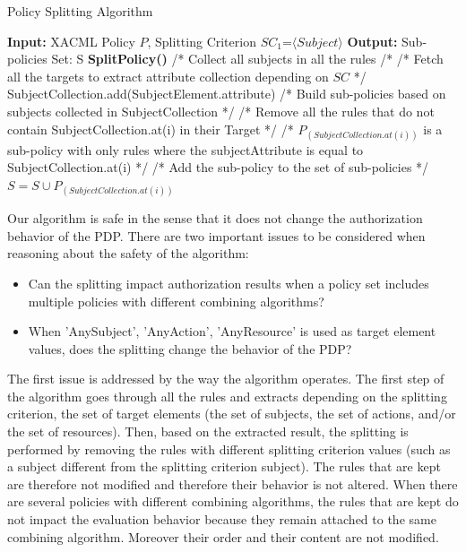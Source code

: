 \begin{algorithmic}
\begin{algorithm}[t]
\caption{Policy Splitting Algorithm}
\STATE \textbf{Input:} XACML Policy $P$, Splitting Criterion $SC_{1}$=$\langle Subject \rangle$
\STATE \textbf{Output:} Sub-policies Set: S
\STATE \textbf{SplitPolicy()}
\STATE /* Collect all subjects in all the rules /*
\STATE /* Fetch all the targets to extract attribute collection depending on $SC$ */
\STATE SubjectCollection.add(SubjectElement.attribute)
\ENDFOR
\ENDFOR
\STATE /* Build sub-policies based on subjects collected in SubjectCollection */
\STATE /* Remove all the rules that do not contain SubjectCollection.at(i) in their Target */
\ENDIF 
\ENDIF
\ENDFOR
\STATE /* $P_{(SubjectCollection.at(i))}$ is a sub-policy with only rules where the subjectAttribute is equal to SubjectCollection.at(i) */
\STATE /* Add the sub-policy to the set of sub-policies */
\STATE $S=S \cup P_{(SubjectCollection.at(i))}$
\ENDFOR
\end{algorithm}
\end{algorithmic}

Our algorithm is safe in the sense that it does not change the authorization behavior of the PDP. 
There are two important issues to be considered when reasoning about the safety of the algorithm:
\begin{itemize}
 \item Can the splitting impact authorization results when a policy set includes multiple policies with different combining algorithms?
 \item When 'AnySubject', 'AnyAction', 'AnyResource' is used as target element values, does the splitting change the behavior of the PDP?
\end{itemize}
The first issue is addressed by the way the algorithm operates. The first step of the algorithm goes through all the rules and extracts 
depending on the splitting criterion, the set of target elements (the set of subjects, 
the set of actions, and/or the set of resources). Then, based on the extracted result, the splitting is performed by removing 
the rules with different splitting criterion values (such as a subject different from 
the splitting criterion subject). The rules that are kept are therefore not modified and therefore their behavior is not altered. When there 
are several policies with different combining algorithms, the rules that are kept do not impact the evaluation behavior 
because they remain attached to the same combining algorithm. Moreover their order and their content are not modified.


